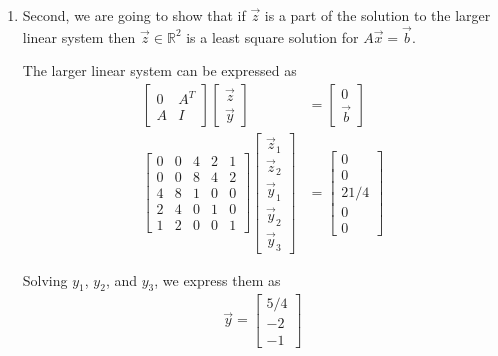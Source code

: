 \documentclass[a4paper,10pt]{article}
\begin{document}
\begin{enumerate}
\begin{enumerate}
{\begin{enumerate}
            From $\vec{y}$, we can tell that $\vec{z}\in \mathbb{R}^2$ is a least square solution for $A\vec{x}=\vec{b}$.

            Thus, the premise, if $\vec{z}\in \mathbb{R}^2$ is a least square solution for $A\vec{x}=\vec{b}$ then $\vec{z}$ is part of a solution to the larger linear system, holds.
            

        \item
            Second, we are going to show that if $\vec{z}$ is a part of the solution to the larger linear system then $\vec{z}\in \mathbb{R}^2$ is a least square solution for $A\vec{x}=\vec{b}$.
            
            The larger linear system can be expressed as
            \begin{align}
                \begin{bmatrix} 0 & A^T \\ A & I \end{bmatrix} \begin{bmatrix} \vec{z} \\ \vec{y} \end{bmatrix} &= \begin{bmatrix} 0 \\ \vec{b} \end{bmatrix} \\
                \begin{bmatrix} 0 & 0 & 4 & 2 & 1 \\ 0 & 0 & 8 & 4 & 2 \\ 4 & 8 & 1 & 0 & 0 \\ 2 & 4 & 0 & 1 & 0 \\ 1 & 2 & 0 & 0 & 1 \end{bmatrix} \begin{bmatrix} \vec{z}_1 \\ \vec{z}_2 \\ \vec{y}_1 \\ \vec{y}_2 \\ \vec{y}_3 \end{bmatrix} &= \begin{bmatrix} 0 \\ 0 \\ 21/4 \\ 0 \\ 0 \end{bmatrix}
            \end{align}
            
            Solving $y_1$, $y_2$, and $y_3$, we express them as
            \begin{align}
                \vec{y} = \begin{bmatrix} 5/4 \\ -2 \\ -1 \end{bmatrix}
            \end{align}


\end{enumerate}}
\end{enumerate}
\end{enumerate}
\end{document}
